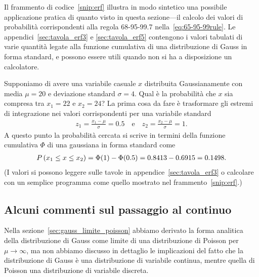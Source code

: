 Il frammento di codice~\ref{snip:erf} illustra in modo sintetico una possibile
applicazione pratica di quanto visto in questa sezione---il calcolo dei
valori di probabilità corrispondenti alla regola 68-95-99.7
nella~\eqref{eq:65-95-99rule}.
Le appendici~\ref{sec:tavola_erf3} e \ref{sec:tavola_erf5} contengono i valori
tabulati di varie quantità legate alla funzione cumulativa di una
distribuzione di Gauss in forma standard, e possono essere utili quando non si
ha a disposizione un calcolatore.

\begin{examplebox}
  \begin{example}
    Supponiamo di avere una variabile casuale $x$ distribuita Gaussianamente
    con media $\mu = 20$ e deviazione standard $\sigma = 4$. Qual è la
    probabilità che $x$ sia compresa tra $x_1 = 22$ e $x_2 = 24$?
    La prima cosa da fare è trasformare gli estremi di integrazione nei
    valori corrispondenti per una variabile standard
    \begin{align*}
      z_1 = \frac{x_1 - \mu}{\sigma} = 0.5 \quad \text{e} \quad
      z_2 = \frac{x_2 - \mu}{\sigma} = 1.
    \end{align*}
    A questo punto la probabilità cercata si scrive in termini della
    funzione cumulativa $\Phi$ di una gaussiana in forma standard come
    \begin{align*}
      \displaystyle P\left(x_1 \leq x \leq x_2\right) = \Phi(1) - \Phi(0.5) =
      0.8413 - 0.6915 = 0.1498.
    \end{align*}
    (I valori si possono leggere sulle tavole in appendice~\ref{sec:tavola_erf3}
    o calcolare con un semplice programma come quello mostrato nel
    frammento~\ref{snip:erf}.)
  \end{example}
\end{examplebox}


\subsection{Alcuni commenti sul passaggio al continuo}

Nella sezione~\ref{sec:gauss_limite_poisson} abbiamo derivato la forma analitica
della distribuzione di Gauss come limite di una distribuzione di Poisson per
$\mu \rightarrow \infty$, ma non abbiamo discusso in dettaglio le implicazioni
del fatto che la distribuzione di Gauss è una distribuzione di variabile
continua, mentre quella di Poisson una distribuzione di variabile discreta.

